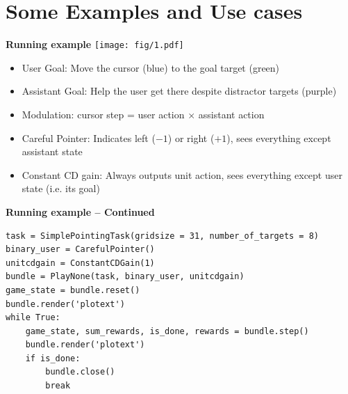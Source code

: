 \documentclass[11pt, xcolor = {dvipsnames}]{beamer}
\begin{document}
\section{Some Examples and Use cases}

\begin{frame}{\textbf{Running example}}
\texttt{[image: fig/1.pdf]} 
\begin{itemize}
\item User Goal:  Move the cursor (blue) to the goal target (green)
\item Assistant Goal: Help the user get there despite distractor targets (purple)
\item Modulation: cursor step = user action $\times$ assistant action
\item Careful Pointer: Indicates left ($-1$) or right ($+1$), sees everything except assistant state
\item Constant CD gain: Always outputs unit action, sees everything except user state (i.e. its goal)
\end{itemize}
\end{frame}


\begin{frame}[fragile]{\textbf{Running example -- Continued}}
\begin{adjustbox}{width=\textwidth}\lstset{language=Python}
\lstset{frame=lines}
\lstset{basicstyle=\footnotesize}
\begin{lstlisting}
task = SimplePointingTask(gridsize = 31, number_of_targets = 8)
binary_user = CarefulPointer()
unitcdgain = ConstantCDGain(1)
bundle = PlayNone(task, binary_user, unitcdgain)
game_state = bundle.reset()
bundle.render('plotext')
while True:
    game_state, sum_rewards, is_done, rewards = bundle.step()
    bundle.render('plotext')
    if is_done:
        bundle.close()
        break
\end{lstlisting}
\end{adjustbox}
\end{frame}
\end{document}
